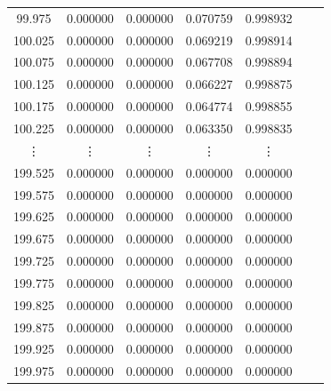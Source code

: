 \documentclass[a4j, titlepage]{jsarticle}
\numberwithin{equation}{section}
\begin{document}
\begin{table}[h]
\begin{tabular}{ccccccc}
                    99.975 & 0.000000 & 0.000000 & 0.070759 & 0.998932 \\
                    100.025 & 0.000000 & 0.000000 & 0.069219 & 0.998914 \\
                    100.075 & 0.000000 & 0.000000 & 0.067708 & 0.998894 \\
                    100.125 & 0.000000 & 0.000000 & 0.066227 & 0.998875 \\
                    100.175 & 0.000000 & 0.000000 & 0.064774 & 0.998855 \\
                    100.225 & 0.000000 & 0.000000 & 0.063350 & 0.998835 \\
                    \vdots & \vdots & \vdots & \vdots & \vdots \vspace{1mm} \\
                    199.525 & 0.000000 & 0.000000 & 0.000000 & 0.000000 \\
                    199.575 & 0.000000 & 0.000000 & 0.000000 & 0.000000 \\
                    199.625 & 0.000000 & 0.000000 & 0.000000 & 0.000000 \\
                    199.675 & 0.000000 & 0.000000 & 0.000000 & 0.000000 \\
                    199.725 & 0.000000 & 0.000000 & 0.000000 & 0.000000 \\
                    199.775 & 0.000000 & 0.000000 & 0.000000 & 0.000000 \\
                    199.825 & 0.000000 & 0.000000 & 0.000000 & 0.000000 \\
                    199.875 & 0.000000 & 0.000000 & 0.000000 & 0.000000 \\
                    199.925 & 0.000000 & 0.000000 & 0.000000 & 0.000000 \\
                    199.975 & 0.000000 & 0.000000 & 0.000000 & 0.000000 \\
                    \hline																	
                \end{tabular}
            \end{table}
\end{document}
